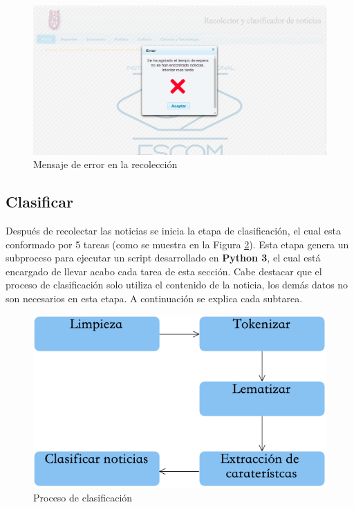\begin{figure}[H]
\centering
\includegraphics[scale=0.3]{imagenes/errorConectividad.png}
\caption{Mensaje de error en la recolección}
\label{fig:notNoRec}
\end{figure}

\subsection{Clasificar}

Después de recolectar las noticias se inicia la etapa de clasificación, el cual esta conformado por 5 tareas (como se muestra en la Figura \ref{fig:cp5:clasificacion}). Esta etapa genera un subproceso para ejecutar un script desarrollado en \textbf{Python 3}, el cual está encargado de llevar acabo cada tarea de esta sección. Cabe destacar que el proceso de clasificación solo utiliza el contenido de la noticia, los demás datos no son necesarios en esta etapa. A continuación se explica cada subtarea.

\begin{figure}[H]
\centering
\includegraphics[scale=0.5]{imagenes/PreprocesamientoWeb.png}
\caption{Proceso de clasificación}
\label{fig:cp5:clasificacion}
\end{figure}


